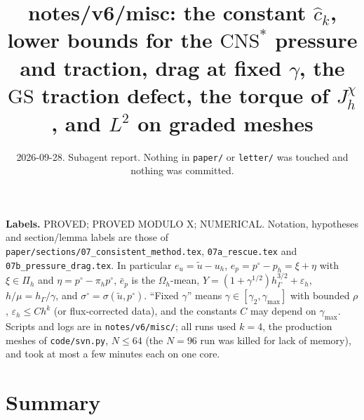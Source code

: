 \documentclass[11pt,reqno]{amsart}
\theoremstyle{plain}
\theoremstyle{definition}
\newcommand{\hG}{h_\Gamma}
\newcommand{\Oh}{\Omega_h}
\newcommand{\Pih}{\Pi_h}
\newcommand{\ut}{\tilde u}
\newcommand{\GS}{\mathrm{GS}}
\newcommand{\CNS}{\mathrm{CNS}^\ast}
\newcommand{\eps}{\varepsilon_h}
\newcommand{\chat}{\hat c_k}
\begin{document}
\title[notes/v6/misc]{notes/v6/misc: the constant $\chat$, lower bounds for the $\CNS$ pressure and traction, drag at fixed $\gamma$, the $\GS$ traction defect, the torque of $J^\chi_h$, and $L^2$ on graded meshes}
\date{2026-09-28. Subagent report. Nothing in \texttt{paper/} or \texttt{letter/} was touched and nothing was committed.}
\maketitle

\noindent\textbf{Labels.} PROVED; PROVED MODULO X; NUMERICAL. Notation, hypotheses and section/lemma labels are those of \texttt{paper/sections/07\_consistent\_method.tex}, \texttt{07a\_rescue.tex} and \texttt{07b\_pressure\_drag.tex}. In particular $e_u=\ut-u_h$, $e_p=p^\circ-p_h=\xi+\eta$ with $\xi\in\Pih$ and $\eta=p^\circ-\pi_hp^\circ$, $\bar e_p$ is the $\Oh$-mean, $Y=(1+\gamma^{1/2})\hG^{3/2}+\eps$, $h/\mu=\hG/\gamma$, and $\sigma^\circ=\sigma(\ut,p^\circ)$. ``Fixed $\gamma$'' means $\gamma\in[\gamma_2,\gamma_{\max}]$ with bounded $\rho$, $\eps\le Ch^k$ (or flux-corrected data), and the constants $C$ may depend on $\gamma_{\max}$. Scripts and logs are in \texttt{notes/v6/misc/}; all runs used $k=4$, the production meshes of \texttt{code/svn.py}, $N\le64$ (the $N=96$ run was killed for lack of memory), and took at most a few minutes each on one core.

\section*{Summary}
\end{document}
